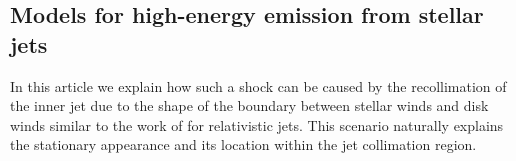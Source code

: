 \subsection{Models for high-energy emission from stellar jets}
In this article we explain how such a shock can be caused by the recollimation of the inner jet due to the shape of the boundary between stellar winds and disk winds similar to the work of \citet{2012MNRAS.422.2282K} for relativistic jets. This scenario naturally explains the stationary appearance and its location within the jet collimation region.